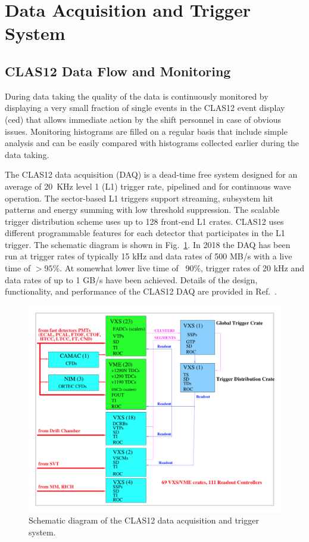 \documentclass[final,3p,twocolumn]{elsarticle}
\begin{document}
\section{Data Acquisition and Trigger System} 

\subsection {CLAS12 Data Flow and Monitoring} 

During data taking the quality of the data is continuously monitored by displaying a very small fraction of single events in 
 the CLAS12 event display (ced) that allows immediate action by the shift personnel in case of obvious issues. Monitoring
 histograms are filled on a regular basis that include simple analysis and can be easily compared with histograms 
 collected earlier during the data taking.  

The CLAS12 data acquisition (DAQ) is a dead-time free system designed for an average of 20~KHz level 1 (L1) 
trigger rate, pipelined and for continuous wave operation. The sector-based  L1 triggers support streaming, subsystem 
hit patterns and energy summing with low threshold suppression.  The scalable trigger distribution scheme 
uses up to 128 front-end L1 crates. CLAS12 uses different programmable features for each detector that 
participates in the L1 trigger. The schematic diagram is shown in Fig.~\ref{daq}. In 2018 the DAQ has been run 
at trigger rates of typically 15 kHz and data rates of 500 MB/s with a live time of $> 95\%$. At somewhat 
lower live time of ~90\%, trigger rates of 20 kHz and data rates of up to 1 GB/s have been achieved.
Details of the design, functionality, and performance of the CLAS12 DAQ are provided in  Ref.~\cite{DAQ}. 
 
\begin{figure}[htbp!]
\centerline{\includegraphics[width=1.0\columnwidth]{clas12-daq.png}}
\caption{Schematic diagram of the CLAS12 data acquisition and trigger system.}
\label{daq}
\end{figure}
\end{document}

